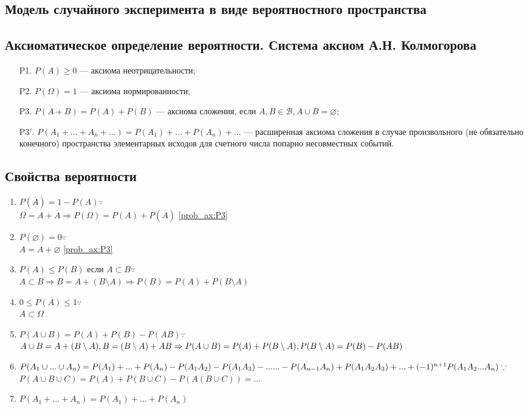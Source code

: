\documentclass[12pt]{article}
\begin{document}
\subsection{Модель случайного эксперимента в виде вероятностного пространства}

\subsection{Аксиоматическое определение вероятности. Система аксиом А.Н. Колмогорова}
\begin{itemize}
	\item[P1.\label{prob_ax:P1}] $P(A) \geq 0$ --- аксиома неотрицательности;
	\item[P2.\label{prob_ax:P2}] $P(\Omega) = 1$ --- аксиома нормированности;
	\item[P3.\label{prob_ax:P3}] $P(A + B) = P(A) + P(B)$ --- аксиома сложения, если
		$A, B \in \mathcal{B}, A \cup B = \varnothing$;
	\item[P3$'$.] $P(A_1 + ... + A_n + ...) = P(A_1) + ... + P(A_n) + ...$ ---
		расширенная аксиома сложения в случае произвольного (не обязательно конечного)
		пространства элементарных исходов для счетного числа попарно несовместных событий.
\end{itemize}

\subsection{Свойства вероятности}
\begin{enumerate} %
	\item $P(\overline{A}) = 1 - P(A) \because$ \\
	      $\Omega = A + \overline{A} \Rightarrow P(\Omega) = P(A) + P(\overline{A})$ \ref{prob_ax:P3}
	\item $P(\varnothing) = 0 \because$ \\
	      $A = A + \varnothing$ \ref{prob_ax:P3}
	\item $P(A) \leq P(B)$ если $A \subset B \because$ \\
	      $A \subset B \Rightarrow B = A + (B \setminus A) \Rightarrow P(B) = P(A) + P(B \setminus A)$
	\item $0 \leq P(A) \leq 1 \because$ \\
	      $A \subset \Omega$
	\item $P(A \cup B) = P(A) + P(B) - P(AB) \because$ \\
	      $A \cup B = A + (B \setminus A), B = (B \setminus A) + AB \Rightarrow \\P(A \cup B) = P(A) + P(B \setminus A), P(B \setminus A) = P(B) - P(AB)$
	\item $P(A_1 \cup ... \cup A_n) = P(A_1) + ... + P(A_n) - P(A_1A_2) - P(A_1A_3) - ... \\
		      ... - P(A_{n-1}A_n) + P(A_1A_2A_3) + ... + (-1)^{n+1}P(A_1A_2...A_n) \because$ \\
	      $P(A \cup B \cup C ) = P(A) + P(B \cup C) - P(A(B \cup C)) = ...$
	\item $P(A_1 + ... + A_n) = P(A_1) + ... + P(A_n)$
\end{enumerate}
\end{document}
